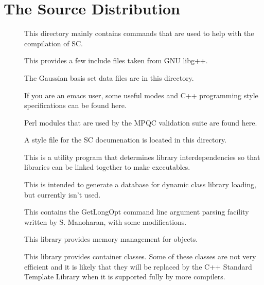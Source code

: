 \documentclass{report}
\begin{document}
\chapter{The Source Distribution}

\begin{description}
\item[]  This directory mainly contains commands that
  are used to help with the compilation of SC.

\item[]  This provides a few include
  files taken from GNU libg++.

\item[] The Gaussian basis set data files are in this
  directory.

\item[] If you are an emacs user, some useful
  modes and C++ programming style specifications can be found
  here.

\item[] Perl modules that are used by the MPQC
  validation suite are found here.

\item[] A style file for the SC documenation
  is located in this directory.

\item[] This is a utility program that determines
  library interdependencies so that libraries can be linked together to
  make executables.
  
\item[]  This is intended to generate a
  database for dynamic class library loading, but currently isn't used.

\item[]
  This contains the GetLongOpt command line argument parsing facility
  written by S. Manoharan, with some modifications.

\item[]
  This library provides memory management for objects.

\item[] This library provides container
  classes.  Some of these classes are not very efficient and it is likely
  that they will be replaced by the C++ Standard Template Library when it
  is supported fully by more compilers.


\end{description}
\end{document}
